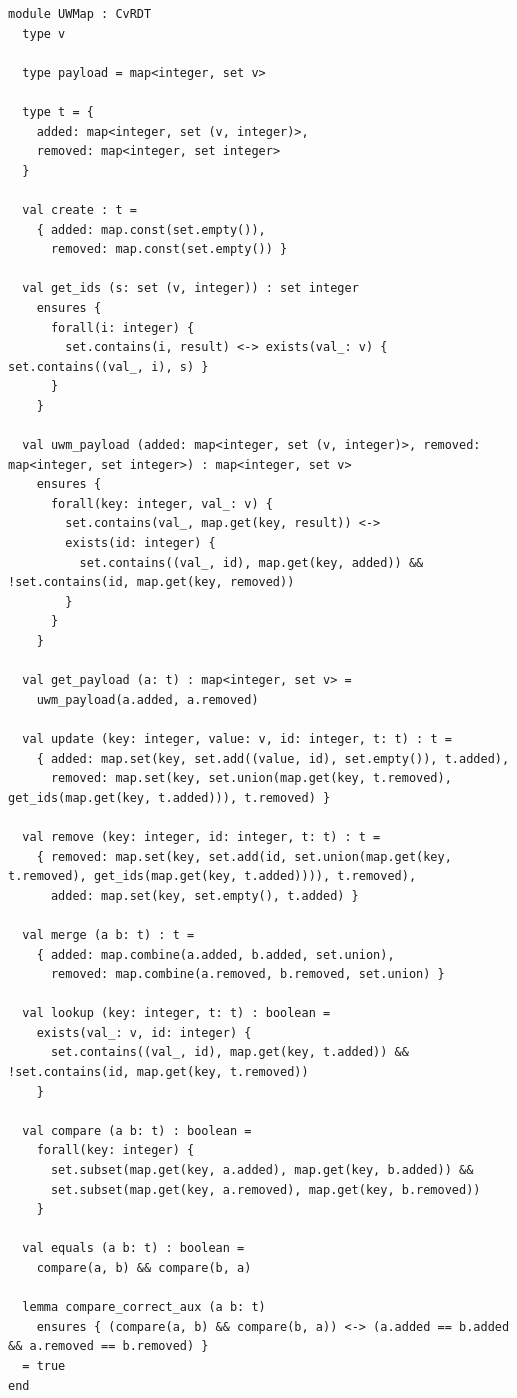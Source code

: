 \begin{lstlisting}[caption={\texttt{UWMap}}, label={lst:app_uwmap}]
module UWMap : CvRDT
  type v

  type payload = map<integer, set v>

  type t = {
    added: map<integer, set (v, integer)>,
    removed: map<integer, set integer>
  }

  val create : t =
    { added: map.const(set.empty()),
      removed: map.const(set.empty()) }

  val get_ids (s: set (v, integer)) : set integer
    ensures {
      forall(i: integer) {
        set.contains(i, result) <-> exists(val_: v) { set.contains((val_, i), s) }
      }
    }

  val uwm_payload (added: map<integer, set (v, integer)>, removed: map<integer, set integer>) : map<integer, set v>
    ensures {
      forall(key: integer, val_: v) {
        set.contains(val_, map.get(key, result)) <->
        exists(id: integer) {
          set.contains((val_, id), map.get(key, added)) && !set.contains(id, map.get(key, removed))
        }
      }
    }

  val get_payload (a: t) : map<integer, set v> =
    uwm_payload(a.added, a.removed)

  val update (key: integer, value: v, id: integer, t: t) : t =
    { added: map.set(key, set.add((value, id), set.empty()), t.added),
      removed: map.set(key, set.union(map.get(key, t.removed), get_ids(map.get(key, t.added))), t.removed) }

  val remove (key: integer, id: integer, t: t) : t =
    { removed: map.set(key, set.add(id, set.union(map.get(key, t.removed), get_ids(map.get(key, t.added)))), t.removed),
      added: map.set(key, set.empty(), t.added) }

  val merge (a b: t) : t =
    { added: map.combine(a.added, b.added, set.union),
      removed: map.combine(a.removed, b.removed, set.union) }

  val lookup (key: integer, t: t) : boolean =
    exists(val_: v, id: integer) {
      set.contains((val_, id), map.get(key, t.added)) && !set.contains(id, map.get(key, t.removed))
    }

  val compare (a b: t) : boolean =
    forall(key: integer) {
      set.subset(map.get(key, a.added), map.get(key, b.added)) &&
      set.subset(map.get(key, a.removed), map.get(key, b.removed))
    }

  val equals (a b: t) : boolean =
    compare(a, b) && compare(b, a)

  lemma compare_correct_aux (a b: t)
    ensures { (compare(a, b) && compare(b, a)) <-> (a.added == b.added && a.removed == b.removed) }
  = true
end
\end{lstlisting}

